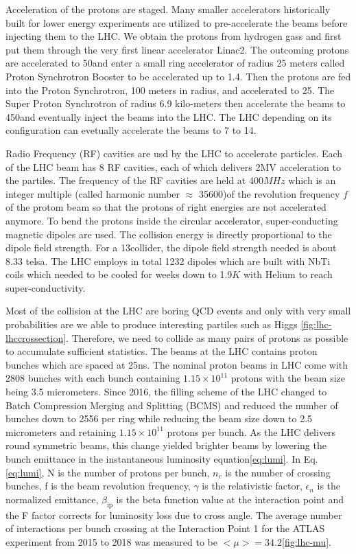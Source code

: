 Acceleration of the protons are staged. Many smaller accelerators historically built for lower energy experiments are utilized to pre-accelerate the beams before injecting them to the LHC. We obtain the protons from hydrogen gass and first put them through the very first linear accelerator Linac2. The outcoming protons are accelerated to 50\mev and enter a small ring accelerator of radius 25 meters called Proton Synchrotron Booster to be accelerated up to 1.4\gev. Then the protons are fed into the Proton Synchrotron, 100 meters in radius, and accelerated to 25\gev. The Super Proton Synchrotron of radius 6.9 kilo-meters then accelerate the beams to 450\gev and eventually inject the beams into the LHC. The LHC depending on its configuration can evetually accelerate the beams to 7 to 14\tev.

Radio Frequency (RF) cavities are usd by the LHC to accelerate particles. Each of the LHC beam has 8 RF cavities, each of which delivers 2MV acceleration to the partiles. The frequency of the RF cavities are held at 400$MHz$ which is an integer multiple (called harmonic number $\approx$ 35600)of the revolution frequency $f$ of the protom beam so that the protons of right energies are not accelerated anymore. To bend the protons inside the circular accelerator, super-conducting magnetic dipoles are used. The collision energy is directly proportional to the dipole field strength. For a 13\tev collider, the dipole field strength needed is about 8.33 telsa. The LHC employs in total 1232 dipoles which are built with NbTi coils which needed to be cooled for weeks down to 1.9$K$ with Helium to reach super-conductivity.

Most of the collision at the LHC are boring QCD events and only with very small probabilities are we able to produce interesting partiles such as Higgs \ref{fig:lhc-lhccrossection}. Therefore, we need to collide as many pairs of protons as possible to accumulate sufficient statistics. The beams at the LHC contains proton bunches which are spaced at 25ns. The nominal proton beams in LHC come with 2808 bunches with each bunch containing $1.15\times 10^{11}$ protons with the beam size being 3.5 micrometers. Since 2016, the filling scheme of the LHC changed to Batch Compression Merging and Splitting (BCMS) and reduced the number of bunches down to 2556 per ring while reducing the beam size down to 2.5 micrometers and retaining $1.15\times 10^{11}$ protons per bunch. As the LHC delivers round symmetric beams, this change yielded brighter beams by lowering the bunch emittance in the instantaneous luminosity equation\ref{eq:lumi}. In Eq.\ref{eq:lumi}, N is the number of protons per bunch, $n_c$ is the number of crossing bunches, f is the beam revolution frequency, $\gamma$ is the relativistic factor, $\epsilon_n$ is the normalized emittance, $\beta_{\text{ip}}$ is the beta function value at the interaction point and the F factor corrects for luminosity loss due to cross angle. The average number of interactions per bunch crossing at the Interaction Point 1 for the ATLAS experiment from 2015 to 2018 was measured to be $<\mu>=34.2$\ref{fig:lhc-mu}. 


